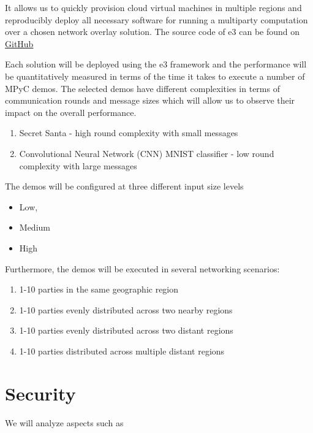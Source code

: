 It allows us to quickly provision cloud virtual machines in multiple
regions and reproducibly deploy all necessary software for running a
multiparty computation over a chosen network overlay solution. The
source code of \gls{e3} can be found on
\href{https://github.com/e-nikolov/mpyc}{GitHub}

Each solution will be deployed using the \gls{e3} framework and the
performance will be quantitatively measured in terms of the time it
takes to execute a number of MPyC demos. The selected demos have
different complexities in terms of communication rounds and message
sizes which will allow us to observe their impact on the overall
performance.

\begin{enumerate}
\def\labelenumi{\arabic{enumi}.}
\tightlist
\item
  Secret Santa - high round complexity with small messages
\item
  Convolutional Neural Network (CNN) MNIST classifier - low round
  complexity with large messages
\end{enumerate}

The demos will be configured at three different input size levels

\begin{itemize}
\tightlist
\item
  Low,
\item
  Medium
\item
  High
\end{itemize}

Furthermore, the demos will be executed in several networking scenarios:

\begin{enumerate}
\def\labelenumi{\arabic{enumi}.}
\tightlist
\item
  1-10 parties in the same geographic region
\item
  1-10 parties evenly distributed across two nearby regions
\item
  1-10 parties evenly distributed across two distant regions
\item
  1-10 parties distributed across multiple distant regions
\end{enumerate}

\hypertarget{security}{%
\section{Security}\label{security}}

We will analyze aspects such as

